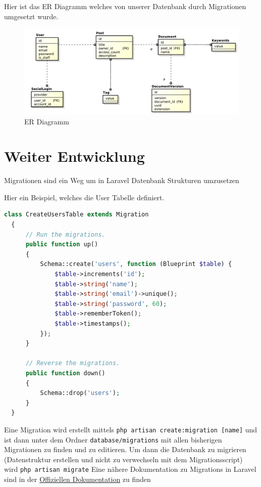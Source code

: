 Hier ist das ER Diagramm welches von unserer Datenbank durch Migrationen umgesetzt wurde.

\begin{figure}[H]
	\begin{center}
		\includegraphics[width=\linewidth]{../Datenstruktur.pdf}
		\caption{ER Diagramm}
	\end{center}
\end{figure}

\section{Weiter Entwicklung}

Migrationen sind ein Weg um in Laravel Datenbank Strukturen umzusetzen

Hier ein Beispiel, welches die User Tabelle definiert.

\begin{lstlisting}[language={PHP}, caption="Migrations Beispiel"]
  class CreateUsersTable extends Migration
  {
      // Run the migrations.
      public function up()
      {
          Schema::create('users', function (Blueprint $table) {
              $table->increments('id');
              $table->string('name');
              $table->string('email')->unique();
              $table->string('password', 60);
              $table->rememberToken();
              $table->timestamps();
          });
      }

      // Reverse the migrations.
      public function down()
      {
          Schema::drop('users');
      }
  }
\end{lstlisting}

Eine Migration wird erstellt mittels \texttt{php artisan create:migration [name]} und ist dann unter dem Ordner \texttt{database/migrations} mit allen bisherigen Migrationen zu finden und zu editieren.
Um dann die Datenbank zu migrieren (Datenstruktur erstellen und nicht zu verwechseln mit dem Migrationsscript) wird \texttt{php artisan migrate}
Eine n\"ahere Dokumentation zu Migrations in Laravel sind in der \href{https://laravel.com/docs/5.2/migrations}{Offiziellen Dokumentation} zu finden
